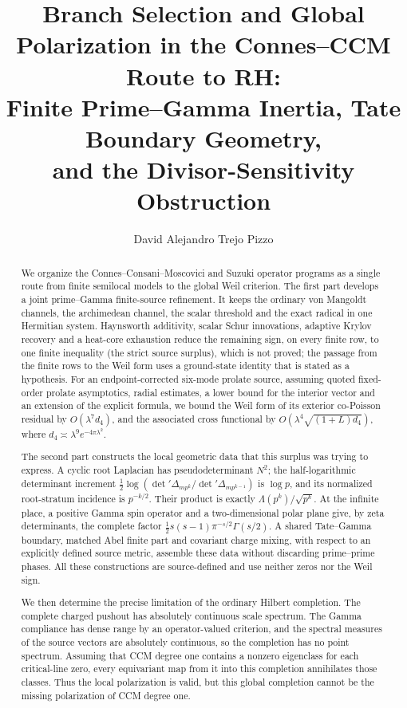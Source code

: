 \documentclass[11pt]{amsart}
\title[Branch selection and global polarization]
{Branch Selection and Global Polarization in the Connes--CCM Route to RH:\\
Finite Prime--Gamma Inertia, Tate Boundary Geometry,\\
and the Divisor-Sensitivity Obstruction}
\author{David Alejandro Trejo Pizzo}
\theoremstyle{definition}
\theoremstyle{remark}
\begin{document}
\begin{abstract}
We organize the Connes--Consani--Moscovici and Suzuki operator programs as
a single route from finite semilocal models to the global Weil criterion.
The first part develops a joint prime--Gamma finite-source refinement.  It
keeps the ordinary von Mangoldt channels, the archimedean channel, the
scalar threshold and the exact radical in one Hermitian system.
Haynsworth additivity, scalar Schur innovations, adaptive
Krylov recovery and a heat-core exhaustion reduce the remaining sign, on
every finite row, to one finite inequality (the strict source surplus),
which is not proved; the passage from the finite rows to the Weil form
uses a ground-state identity that is stated as a hypothesis.  For an endpoint-corrected six-mode prolate
source, assuming quoted fixed-order prolate asymptotics, radial
estimates, a lower bound for the interior vector and an extension of the
explicit formula, we bound the Weil form of its exterior co-Poisson
residual by
\(O(\lambda^7d_4)\), and the associated cross functional by
\(O(\lambda^4\sqrt{(1+L)d_4})\), where
\(d_4\asymp\lambda^9e^{-4\pi\lambda^2}\).

The second part constructs the local geometric data that this surplus was
trying to express.  A cyclic root Laplacian has pseudodeterminant \(N^2\);
the half-logarithmic determinant increment
\(\tfrac12\log(\det'\Delta_{mp^k}/\det'\Delta_{mp^{k-1}})\) is \(\log p\),
and its normalized root-stratum incidence is \(p^{-k/2}\).  Their product
is exactly \(\Lambda(p^k)/\sqrt{p^k}\).  At the infinite place, a positive
Gamma spin operator and a two-dimensional polar plane give, by zeta
determinants, the complete factor
\(\frac12s(s-1)\pi^{-s/2}\Gamma(s/2)\).  A shared Tate--Gamma boundary,
matched Abel finite part and covariant charge mixing, with respect to an
explicitly defined source metric, assemble these data
without discarding prime--prime phases.  All these constructions are
source-defined and use neither zeros nor the Weil sign.

We then determine the precise limitation of the ordinary Hilbert
completion.  The complete charged pushout has absolutely continuous scale
spectrum.  The Gamma compliance has dense range by an operator-valued criterion,
and the spectral measures of the source vectors are absolutely
continuous, so the completion has no point spectrum.
Assuming that CCM degree one contains a nonzero eigenclass for each
critical-line zero, every equivariant map from it into this completion
annihilates those classes.  Thus the
local polarization is valid, but this global completion cannot be the
missing polarization of CCM degree one.


\end{abstract}
\end{document}
